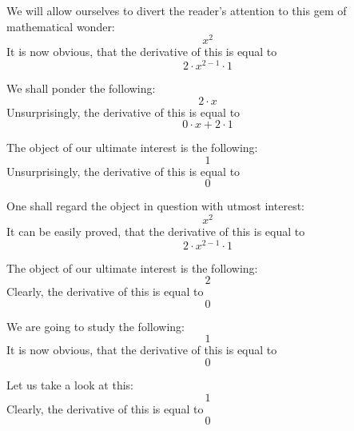 \documentclass{article}
\begin{document}
We will allow ourselves to divert the reader's attention to this gem of mathematical wonder:
\begin{equation}
x ^{2 } 
\end{equation}
It is now obvious, that the derivative of this is equal to
\begin{equation}
2 \cdot x ^{2 - 1 } \cdot 1 
\end{equation}

We shall ponder the following:
\begin{equation}
2 \cdot x 
\end{equation}
Unsurprisingly, the derivative of this is equal to
\begin{equation}
0 \cdot x + 2 \cdot 1 
\end{equation}

The object of our ultimate interest is the following:
\begin{equation}
1 
\end{equation}
Unsurprisingly, the derivative of this is equal to
\begin{equation}
0 
\end{equation}

One shall regard the object in question with utmost interest:
\begin{equation}
x ^{2 } 
\end{equation}
It can be easily proved, that the derivative of this is equal to
\begin{equation}
2 \cdot x ^{2 - 1 } \cdot 1 
\end{equation}

The object of our ultimate interest is the following:
\begin{equation}
2 
\end{equation}
Clearly, the derivative of this is equal to
\begin{equation}
0 
\end{equation}

We are going to study the following:
\begin{equation}
1 
\end{equation}
It is now obvious, that the derivative of this is equal to
\begin{equation}
0 
\end{equation}

Let us take a look at this:
\begin{equation}
1 
\end{equation}
Clearly, the derivative of this is equal to
\begin{equation}
0 
\end{equation}
\end{document}
